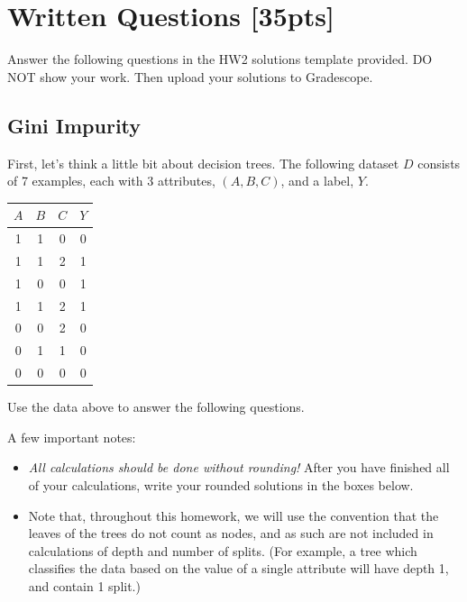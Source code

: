 \section{Written Questions [35pts]}
\label{sec:written}

Answer the following questions in the HW2 solutions template provided. DO NOT show your work. Then upload your solutions to Gradescope.

\subsection{Gini Impurity}
\label{sec:gini}

First, let's think a little bit about decision trees. The following dataset $D$ consists of 7 examples, each with 3 attributes, $(A,B,C)$, and a label, $Y$.

\begin{center}
\begin{tabular}{|c|c|c|c|}
\hline
$A$ & $B$ & $C$ & $Y$ \\ \hline
1 & 1 & 0 & 0     \\ \hline
1 & 1 & 2 & 1     \\ \hline
1 & 0 & 0 & 1     \\ \hline
1 & 1 & 2 & 1     \\ \hline
0 & 0 & 2 & 0     \\ \hline
0 & 1 & 1 & 0     \\ \hline
0 & 0 & 0 & 0     \\ \hline
\end{tabular}
\end{center}


Use the data above to answer the following questions. 

\begin{notebox}
A few important notes:
\begin{itemize}
    \item \emph{All calculations should be done without rounding!} After you have finished all of your calculations, write your rounded solutions in the boxes below.
    \item Note that, throughout this homework, we will use the convention that the leaves of the trees do not count as nodes, and as such are not included in calculations of depth and number of splits. (For example, a tree which classifies the data based on the value of a single attribute will have depth 1, and contain 1 split.)
\end{itemize}
\end{notebox}

